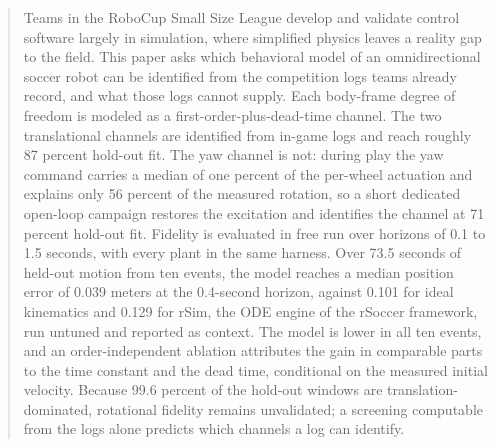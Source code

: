 \begin{abstract}
Teams in the RoboCup Small Size League develop and validate control software largely in simulation, where simplified physics leaves a reality gap to the field. This paper asks which behavioral model of an omnidirectional soccer robot can be identified from the competition logs teams already record, and what those logs cannot supply. Each body-frame degree of freedom is modeled as a first-order-plus-dead-time channel. The two translational channels are identified from in-game logs and reach roughly 87 percent hold-out fit. The yaw channel is not: during play the yaw command carries a median of one percent of the per-wheel actuation and explains only 56 percent of the measured rotation, so a short dedicated open-loop campaign restores the excitation and identifies the channel at 71 percent hold-out fit. Fidelity is evaluated in free run over horizons of 0.1 to 1.5 seconds, with every plant in the same harness. Over 73.5 seconds of held-out motion from ten events, the model reaches a median position error of 0.039 meters at the 0.4-second horizon, against 0.101 for ideal kinematics and 0.129 for rSim, the ODE engine of the rSoccer framework, run untuned and reported as context. The model is lower in all ten events, and an order-independent ablation attributes the gain in comparable parts to the time constant and the dead time, conditional on the measured initial velocity. Because 99.6 percent of the hold-out windows are translation-dominated, rotational fidelity remains unvalidated; a screening computable from the logs alone predicts which channels a log can identify.
\end{abstract}

